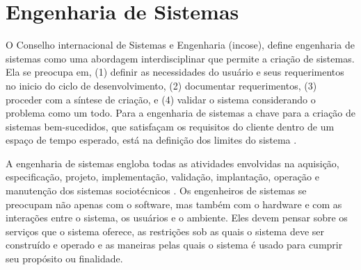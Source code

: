         \begin{figure}[h!]
            \centering
        \end{figure}
  
            
  \section{Engenharia de Sistemas}
        
    O Conselho internacional de Sistemas e Engenharia (\acrshort{incose}), define engenharia de sistemas como uma abordagem interdisciplinar que permite a criação de sistemas. Ela se preocupa em, (1) definir as necessidades do usuário e seus requerimentos no inicio do ciclo de desenvolvimento, (2) documentar requerimentos, (3) proceder com a síntese de criação, e (4) validar o sistema considerando o problema como um todo. Para a engenharia de sistemas a chave para a criação de sistemas bem-sucedidos, que satisfaçam os requisitos do cliente dentro de um espaço de tempo esperado, está na definição dos limites do sistema \cite{barry2009agent}.
    
    
    A engenharia de sistemas engloba todas as atividades envolvidas na aquisição, especificação, projeto, implementação, validação, implantação, operação e manutenção dos sistemas sociotécnicos \cite{sommerville2003engenharia}. Os engenheiros de sistemas se preocupam não apenas com o software, mas também com o hardware e com as interações entre o sistema, os usuários e o ambiente. Eles devem pensar sobre os serviços que o sistema oferece, as restrições sob as quais o sistema deve ser construído e operado e as maneiras pelas quais o sistema é usado para cumprir seu propósito ou finalidade.
    
